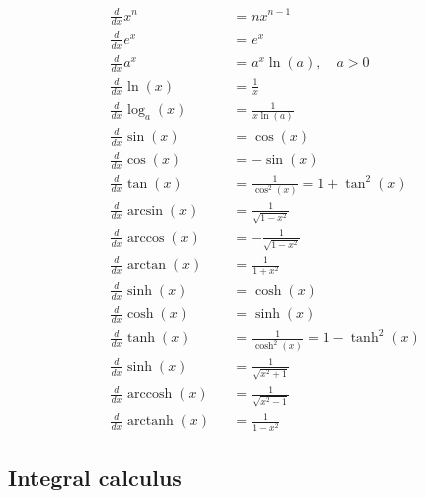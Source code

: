 \begin{align*}
     & \frac{d}{dx}x^n                       &  & =nx^{n-1}                                            \\
     & \frac{d}{dx}e^x                       &  & =e^x                                                 \\
     & \frac{d}{dx}a^x                       &  & =a^x\ln(a),\quad a>0                                 \\
     & \frac{d}{dx}\ln(x)                    &  & =\frac1x                                             \\
     & \frac{d}{dx}\log_a(x)                 &  & =\frac1{x\ln(a)}                                     \\
     & \frac{d}{dx}\sin(x)                   &  & =\cos(x)                                             \\
     & \frac{d}{dx}\cos(x)                   &  & =-\sin(x)                                            \\
     & \frac{d}{dx}\tan(x)                   &  & =\frac1{\cos^2(x)}=1+\tan^2(x)                       \\
     & \frac{d}{dx}\arcsin(x)                &  & =\frac1{\sqrt{1-x^2}}                                \\
     & \frac{d}{dx}\arccos(x)                &  & =-\frac1{\sqrt{1-x^2}}                               \\
     & \frac{d}{dx}\arctan(x)                &  & =\frac1{1+x^2}                                       \\
     & \frac{d}{dx}\sinh(x)                  &  & =\cosh(x)                                            \\
     & \frac{d}{dx}\cosh(x)                  &  & =\sinh(x)                                            \\
     & \frac{d}{dx}\tanh(x)                  &  & =\frac{1}{\cosh^{2}(x)}=1-\tanh^{2}(x) \\
     & \frac{d}{dx}\sinh(x)                  &  & =\frac1{\sqrt{x^2+1}}                                \\
     & \frac{d}{dx}\operatorname{arccosh}(x) &  & =\frac1{\sqrt{x^2-1}}                                \\
     & \frac{d}{dx}\operatorname{arctanh}(x) &  & =\frac1{1-x^2}
\end{align*}

\subsection{Integral calculus}


